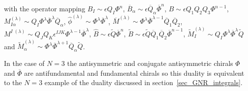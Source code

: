 \documentclass[12pt]{article}
\numberwithin{equation}{section}
\begin{document}
with the operator mapping $B_I \sim \epsilon Q_I \Phi^n$, $\overline{B}_{\alpha} \sim \epsilon \overline{Q}_{\alpha} \overline{\Phi}^n$, $B \sim \epsilon Q_1 Q_2 Q_3 \Phi^{n-1}$, $M^{(\lambda)}_{I \alpha} \sim Q_I \Phi^\lambda \overline{\Phi}^\lambda \overline{Q}_{\alpha}$, $\widehat{\phi}^{(\lambda)} \sim \Phi^\lambda \overline{\Phi}^\lambda$, $\overline{M}^{(\lambda)} \sim \Phi^\lambda \overline{\Phi}^{\lambda-1} \overline{Q}_1 \overline{Q}_2$, $M^{I \; (\lambda)} \sim Q_J Q_K \epsilon^{IJK} \Phi^{\lambda-1} \overline{\Phi}^\lambda$, $\widehat{B} \sim \epsilon \widetilde{Q} \overline{\Phi}^n$, $\widetilde{B} \sim \epsilon \widetilde{Q} \overline{Q}_1 \overline{Q}_2 \overline{\Phi}^{n-1}$, $\widetilde{M}^{(\lambda)}_I \sim Q_I \Phi^\lambda \overline{\Phi}^\lambda \widetilde{Q}$ and $\widetilde{M}^{(\lambda)}_{\alpha} \sim \Phi^\lambda \overline{\Phi}^{\lambda+1} \overline{Q}_{\alpha} \widetilde{Q}$.

In the case of $N=3$ the antisymmetric and conjugate antisymmetric chirals $\Phi$ and $\overline{\Phi}$ are antifundamental and fundamental chirals so this duality is equivalent to the $N = 3$ example of the duality discussed in section~\ref{sec_GNR_integrals}.
\end{document}
